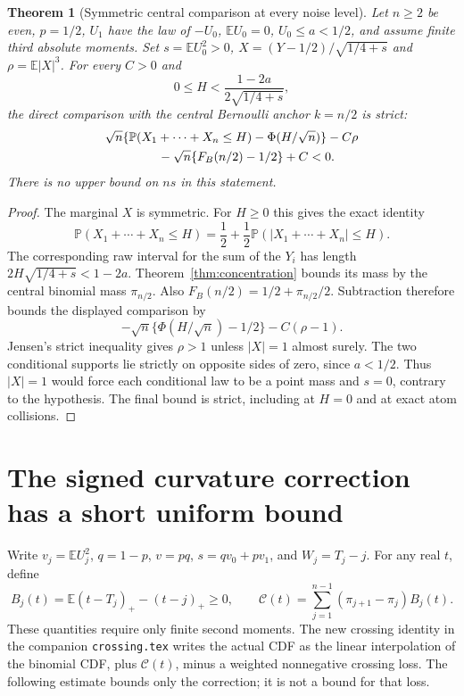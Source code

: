 \documentclass[11pt,a4paper]{article}
\newcommand{\E}{\mathbb E}\newcommand{\Pp}{\mathbb P}
\newtheorem{theorem}{Theorem}\newtheorem{lemma}[theorem]{Lemma}
\begin{document}
\begin{theorem}[Symmetric central comparison at every noise level]
Let $n\ge2$ be even, $p=1/2$, $U_1$ have the law of $-U_0$,
$\E U_0=0$, $U_0\le a<1/2$, and assume finite third absolute moments.
Set $s=\E U_0^2>0$, $X=(Y-1/2)/\sqrt{1/4+s}$ and
$\rho=\E|X|^3$. For every $C>0$ and
\[
             0\le H<\frac{1-2a}{2\sqrt{1/4+s}},
\]
the direct comparison with the central Bernoulli anchor $k=n/2$ is strict:
\begin{align*}
 &\sqrt n\{\Pp(X_1+\cdots+X_n\le H)-\Phi(H/\sqrt n)\}-C\rho\\
 &\hspace{15mm}-\sqrt n\{F_B(n/2)-1/2\}+C<0.
\end{align*}
There is no upper bound on $ns$ in this statement.
\end{theorem}
\begin{proof}
The marginal $X$ is symmetric. For $H\ge0$ this gives the exact identity
\[
 \Pp(X_1+\cdots+X_n\le H)
 =\frac12+\frac12\Pp(|X_1+\cdots+X_n|\le H).
\]
The corresponding raw interval for the sum of the $Y_i$ has length
$2H\sqrt{1/4+s}<1-2a$. Theorem~\ref{thm:concentration} bounds its
mass by the central binomial mass $\pi_{n/2}$. Also
$F_B(n/2)=1/2+\pi_{n/2}/2$. Subtraction therefore bounds the displayed
comparison by
\[
       -\sqrt n\{\Phi(H/\sqrt n)-1/2\}-C(\rho-1).
\]
Jensen's strict inequality gives $\rho>1$ unless $|X|=1$ almost surely.
The two conditional supports lie strictly on opposite sides of zero,
since $a<1/2$. Thus $|X|=1$ would force each conditional law to be a
point mass and $s=0$, contrary to the hypothesis. The final bound is strict,
including at $H=0$ and at exact atom collisions.
\end{proof}

\section{The signed curvature correction has a short uniform bound}
Write $v_j=\E U_j^2$, $q=1-p$, $v=pq$, $s=qv_0+pv_1$, and
$W_j=T_j-j$. For any real $t$, define
\[
 B_j(t)=\E(t-T_j)_+-(t-j)_+\ge0,\qquad
 \mathcal C(t)=\sum_{j=1}^{n-1}(\pi_{j+1}-\pi_j)B_j(t).
\]
These quantities require only finite second moments. The new crossing
identity in the companion \texttt{crossing.tex} writes the actual CDF as
the linear interpolation of the binomial CDF, plus $\mathcal C(t)$,
minus a weighted nonnegative crossing loss. The following estimate bounds
only the correction; it is not a bound for that loss.
\end{document}
